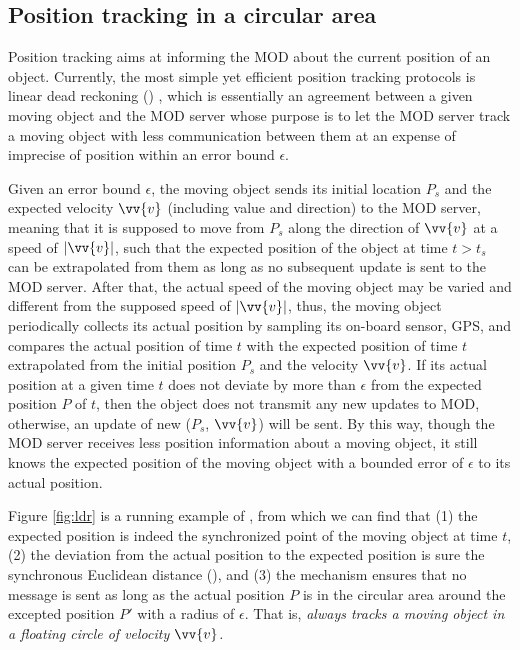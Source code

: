 \subsection{Position tracking in a circular area}

Position tracking aims at informing the MOD about the current position of an object. Currently, the most simple yet efficient position tracking protocols is linear dead reckoning (\ldr) \cite{ Wolfson:PositionTracking}, which is essentially an agreement between a given moving object and the MOD server whose purpose is to let the MOD server track a moving object with less communication between them at an expense of imprecise of position within an error bound $\epsilon$.  

Given an error bound $\epsilon$, the moving object sends its initial location $P_s$ and the expected velocity $\vv{v}$
(including value and direction) to the MOD server, meaning that it is supposed to move from $P_s$ along the direction of $\vv{v}$ at a speed of $|\vv{v}|$, such that the expected position of the object at time $t>t_s$ can be extrapolated from them as long as no subsequent update is sent to the MOD server. 
After that, the actual speed of the moving object may be varied and different from the supposed speed of $|\vv{v}|$, thus, the moving object periodically collects its actual position by sampling its on-board sensor, \eg GPS, and compares the actual position of time $t$ with the expected position of time $t$ extrapolated from the initial position $P_s$ and the velocity $\vv{v}$. If its actual position at a given time $t$ does not deviate by more than $\epsilon$ from the expected position $P$ of $t$, then the object does not transmit any new updates to MOD, otherwise, an update of new ($P_s$, $\vv{v}$) will be sent.
%
By this way, though the MOD server receives less position information about a moving object, it still knows the expected position of the moving object with a bounded error of $\epsilon$ to its actual position.


Figure \ref{fig:ldr} is a running example of \ldr, from which we can find that (1) the expected position is indeed the synchronized point of the moving object at time $t$, (2) the deviation from the actual position to the expected position is sure the synchronous Euclidean distance (\sed), and (3) the \ldr mechanism ensures that no message is sent as long as the actual position $P$ is in the circular area around the excepted position $P'$ with a radius of $\epsilon$. That is, \emph{\ldr always tracks a moving object in a floating circle of velocity $\vv{v}$.}


